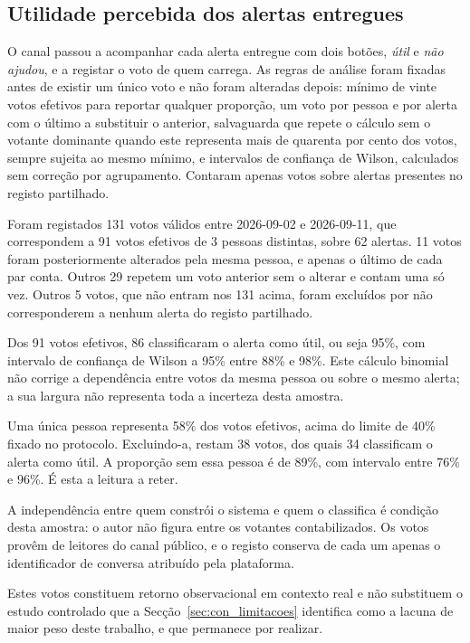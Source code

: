 \subsection{Utilidade percebida dos alertas entregues}
\label{sec:av_feedback}

O canal passou a acompanhar cada alerta entregue com dois botões, \emph{útil} e \emph{não ajudou}, e a registar o voto de quem carrega. As regras de análise foram fixadas antes de existir um único voto e não foram alteradas depois: mínimo de vinte votos efetivos para reportar qualquer proporção, um voto por pessoa e por alerta com o último a substituir o anterior, salvaguarda que repete o cálculo sem o votante dominante quando este representa mais de quarenta por cento dos votos, sempre sujeita ao mesmo mínimo, e intervalos de confiança de Wilson, calculados sem correção por agrupamento.
Contaram apenas votos sobre alertas presentes no registo partilhado.

Foram registados 131 votos válidos entre 2026-09-02 e 2026-09-11, que correspondem a 91 votos efetivos de 3 pessoas distintas, sobre 62 alertas. 11 votos foram posteriormente alterados pela mesma pessoa, e apenas o último de cada par conta. Outros 29 repetem um voto anterior sem o alterar e contam uma só vez. Outros 5 votos, que não entram nos 131 acima, foram excluídos por não corresponderem a nenhum alerta do registo partilhado.

Dos 91 votos efetivos, 86 classificaram o alerta como útil, ou seja 95\%, com intervalo de confiança de Wilson a 95\% entre 88\% e 98\%. Este cálculo binomial não corrige a dependência entre votos da mesma pessoa ou sobre o mesmo alerta; a sua largura não representa toda a incerteza desta amostra.

Uma única pessoa representa 58\% dos votos efetivos, acima do limite de 40\% fixado no protocolo. Excluindo-a, restam 38 votos, dos quais 34 classificam o alerta como útil.
A proporção sem essa pessoa é de 89\%, com intervalo entre 76\% e 96\%. É esta a leitura a reter.

A independência entre quem constrói o sistema e quem o classifica é condição desta amostra: o autor não figura entre os votantes contabilizados. Os votos provêm de leitores do canal público, e o registo conserva de cada um apenas o identificador de conversa atribuído pela plataforma.

Estes votos constituem retorno observacional em contexto real e não substituem o estudo controlado que a Secção~\ref{sec:con_limitacoes} identifica como a lacuna de maior peso deste trabalho, e que permanece por realizar.

